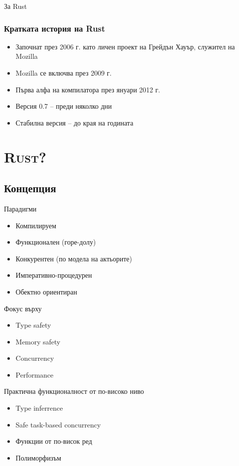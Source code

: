 \documentclass[xcolor=x11names,compress]{beamer}
\renewcommand{\(}{\begin{columns}}
\renewcommand{\)}{\end{columns}}
\newcommand{\<}[1]{\begin{column}{#1}}
\renewcommand{\>}{\end{column}}
\begin{document}
\begin{frame}{За Rust}
  \frametitle{Кратката история на Rust}
  \pause
  \begin{itemize}[<+->]
  \item Започнат през 2006 г. като личен проект на Грейдън Хауър, служител на Mozilla
  \item Mozilla се включва през 2009 г.
  \item Първа алфа на компилатора през януари 2012 г.
  \item Версия 0.7 -- преди няколко дни
  \item Стабилна версия -- до края на годината
  \end{itemize}
\end{frame}

\section{\scshape Rust?}
\subsection{Концепция}

\begin{frame}{Парадигми}
  \pause
  \begin{itemize}[<+->]
  \item Компилируем
  \item Функционален (горе-долу)
  \item Конкурентен (по модела на актьорите)
  \item Императивно-процедурен
  \item Обектно ориентиран
  \end{itemize}
\end{frame}

\begin{frame}{Фокус върху}
  \pause
  \begin{itemize}[<+->]
  \item Type safety
  \item Memory safety
  \item Concurrency
  \item Performance
  \end{itemize}
\end{frame}

\begin{frame}{Практична функционалност от по-високо ниво}
  \pause
  \begin{itemize}[<+->]
  \item Type inferrence
  \item Safe task-based concurrency
  \item Функции от по-висок ред
  \item Полиморфизъм
  \end{itemize}
\end{frame}
\end{document}
